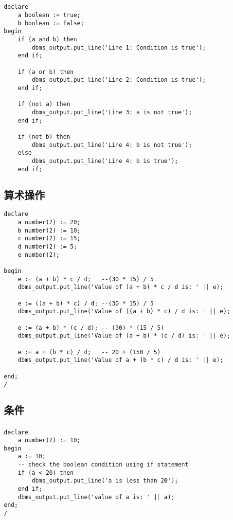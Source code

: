 \documentclass{article}
\begin{document}
\subsection{}
\begin{verbatim}
declare
	a boolean := true;
	b boolean := false;
begin
	if (a and b) then
		dbms_output.put_line('Line 1: Condition is true');
	end if;

	if (a or b) then
		dbms_output.put_line('Line 2: Condition is true');
	end if;

	if (not a) then
		dbms_output.put_line('Line 3: a is not true');
	end if;

	if (not b) then
		dbms_output.put_line('Line 4: b is not true');
	else
		dbms_output.put_line('Line 4: b is true');
	end if;

\end{verbatim}

\subsection{算术操作}
\begin{verbatim}
declare 
	a number(2) := 20;
	b number(2) := 10;
	c number(2) := 15;
	d number(2) := 5;
	e number(2);

begin
	e := (a + b) * c / d;	--(30 * 15) / 5
	dbms_output.put_line('Value of (a + b) * c / d is: ' || e);

	e := ((a + b) * c) / d;	--(30 * 15) / 5
	dbms_output.put_line('Value of ((a + b) * c) / d is: ' || e);

	e := (a + b) * (c / d);	-- (30) * (15 / 5)
	dbms_output.put_line('Value of (a + b) * (c / d) is: ' || e);

	e := a + (b * c) / d;	-- 20 + (150 / 5)
	dbms_output.put_line('Value of a + (b * c) / d is: ' || e);

end;
/
\end{verbatim}

\subsection{条件}
\subsubsection{}
\begin{verbatim}
declare
	a number(2) := 10;
begin
	a := 10;
	-- check the boolean condition using if statement
	if (a < 20) then
		dbms_output.put_line('a is less than 20');
	end if;
	dbms_output.put_line('value of a is: ' || a);
end;
/
\end{verbatim}
\end{document}
